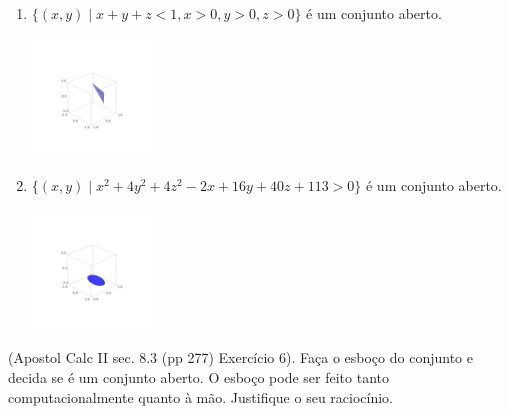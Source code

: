 \documentclass[../main.tex]{subfiles}
\begin{document}
\begin{solucao}
\begin{enumerate}[label=\alph*)]
\begin{center}
				\end{center}
				\item $\{(x,y) \mid x+y+z<1, x>0, y>0, z>0\}$ é um conjunto aberto.
				\begin{center}
					\includegraphics[width=0.25\textwidth]{imagens/lista03/picture_lista03.02_q02_item05.png}
				\end{center}
				\item $\{(x,y) \mid x^2+4y^2+4z^2-2x+16y+40z+113>0\}$ é um conjunto aberto.
				\begin{center}
					\includegraphics[width=0.25\textwidth]{imagens/lista03/picture_lista03.02_q02_item06.png}
				\end{center}
			\end{enumerate}
		\end{solucao}
		
		\begin{exercicio}{3}
			(Apostol Calc II sec. 8.3 (pp 277) Exercício 6). Faça o esboço do
			conjunto e decida se é um conjunto aberto. O esboço pode ser feito tanto computacionalmente
			quanto à mão. Justifique o seu raciocínio.
		\end{exercicio}
		
\end{document}
